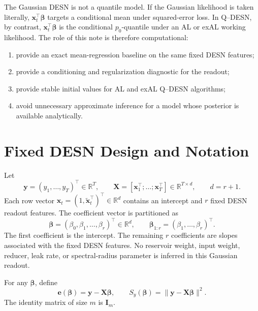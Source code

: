 \documentclass[11pt]{article}
\newcommand{\R}{\mathbb{R}}
\newcommand{\vect}[1]{\bm{#1}}
\newcommand{\mat}[1]{\bm{#1}}
\begin{document}
The Gaussian DESN is not a quantile model. If the Gaussian likelihood is taken
literally, \(\vect x_t^\top\vect\beta\) targets a conditional mean under
squared-error loss. In Q--DESN, by contrast, \(\vect x_t^\top\vect\beta\) is the
conditional \(p_0\)-quantile under an AL or exAL working likelihood. The role of
this note is therefore computational:
\begin{enumerate}[label=(\roman*)]
\item provide an exact mean-regression baseline on the same fixed DESN features;
\item provide a conditioning and regularization diagnostic for the readout;
\item provide stable initial values for AL and exAL Q--DESN algorithms;
\item avoid unnecessary approximate inference for a model whose posterior is
available analytically.
\end{enumerate}

\section{Fixed DESN Design and Notation}
\label{sec:fixed_design}

Let
\begin{equation}
\label{eq:y_X_beta_dimensions}
\vect y=(y_1,\ldots,y_T)^\top\in\R^T,
\qquad
\mat X=[\vect x_1^\top;\ldots;\vect x_T^\top]\in\R^{T\times d},
\qquad d=r+1.
\end{equation}
Each row vector \(\vect x_t=(1,\tilde{\vect x}_t^\top)^\top\in\R^d\) contains
an intercept and \(r\) fixed DESN readout features. The coefficient vector is
partitioned as
\begin{equation}
\label{eq:beta_partition}
\vect\beta=(\beta_0,\beta_1,\ldots,\beta_r)^\top\in\R^d,
\qquad
\vect\beta_{1:r}=(\beta_1,\ldots,\beta_r)^\top.
\end{equation}
The first coefficient is the intercept. The remaining \(r\) coefficients are
slopes associated with the fixed DESN features. No reservoir weight, input
weight, reducer, leak rate, or spectral-radius parameter is inferred in this
Gaussian readout.

For any \(\vect\beta\), define
\begin{equation}
\label{eq:residuals}
\vect e(\vect\beta)=\vect y-\mat X\vect\beta,
\qquad
S_y(\vect\beta)=\|\vect y-\mat X\vect\beta\|^2.
\end{equation}
The identity matrix of size \(m\) is \(\mat I_m\).
\end{document}
